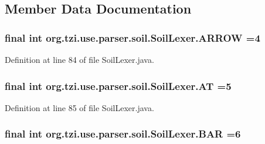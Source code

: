 \subsection{Member Data Documentation}
\hypertarget{classorg_1_1tzi_1_1use_1_1parser_1_1soil_1_1_soil_lexer_a9d4b3804a2c227d6651b402216f6f509}{
\subsubsection[{A\-R\-R\-O\-W}]{\setlength{\rightskip}{0pt plus 5cm}final int org.\-tzi.\-use.\-parser.\-soil.\-Soil\-Lexer.\-A\-R\-R\-O\-W =4\hspace{0.3cm}{\ttfamily [static]}}}\label{classorg_1_1tzi_1_1use_1_1parser_1_1soil_1_1_soil_lexer_a9d4b3804a2c227d6651b402216f6f509}


Definition at line 84 of file Soil\-Lexer.\-java.

\hypertarget{classorg_1_1tzi_1_1use_1_1parser_1_1soil_1_1_soil_lexer_afdbb3c34b12626a91b65c0509f0f2a43}{
\subsubsection[{A\-T}]{\setlength{\rightskip}{0pt plus 5cm}final int org.\-tzi.\-use.\-parser.\-soil.\-Soil\-Lexer.\-A\-T =5\hspace{0.3cm}{\ttfamily [static]}}}\label{classorg_1_1tzi_1_1use_1_1parser_1_1soil_1_1_soil_lexer_afdbb3c34b12626a91b65c0509f0f2a43}


Definition at line 85 of file Soil\-Lexer.\-java.

\hypertarget{classorg_1_1tzi_1_1use_1_1parser_1_1soil_1_1_soil_lexer_af63e25774e7254887133bec45d33c9f4}{
\subsubsection[{B\-A\-R}]{\setlength{\rightskip}{0pt plus 5cm}final int org.\-tzi.\-use.\-parser.\-soil.\-Soil\-Lexer.\-B\-A\-R =6\hspace{0.3cm}{\ttfamily [static]}}}\label{classorg_1_1tzi_1_1use_1_1parser_1_1soil_1_1_soil_lexer_af63e25774e7254887133bec45d33c9f4}


